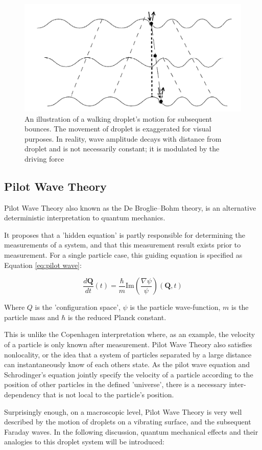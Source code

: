 \begin{figure}[htbp]
\includegraphics[width=12cm]{theory/walkingDroplet}
\centering
\caption{ An illustration of a walking droplet's motion for subsequent bounces. The movement of droplet is exaggerated for visual purposes. In reality, wave amplitude decays with distance from droplet and is not necessarily constant; it is modulated by the driving force }
\centering
\label{walker}

\end{figure}

\subsection{Pilot Wave Theory}
Pilot Wave Theory also known as the De Broglie–Bohm theory, is an alternative deterministic interpretation to quantum mechanics. 

It proposes that a 'hidden equation' is partly responsible for determining the measurements of a system, and that this measurement result exists prior to measurement. For a single particle case, this guiding equation is specified as Equation \ref{eq:pilot wave}: 

\begin{equation} \label{eq:pilot wave}
\frac{d\mathbf{Q}}{dt}(t) = \frac{\hbar}{m} \mathrm{Im}\left(\frac{\nabla \psi}{\psi}\right)(\mathbf{Q}, t)
\end{equation}


Where $Q$ is the 'configuration space', $\psi$ is the particle wave-function, $m$ is the particle mass and $\hbar$ is the reduced Planck constant. 

This is unlike the Copenhagen interpretation where, as an example, the velocity of a particle is only known after measurement. Pilot Wave Theory also satisfies nonlocality, or the idea that a system of particles separated by a large distance can instantaneously know of each others state. As the pilot wave equation and Schrodinger's equation jointly specify the velocity of a particle according to the position of other particles in the defined 'universe', there is a necessary inter-dependency that is not local to the particle's position. 

Surprisingly enough, on a macroscopic level, Pilot Wave Theory is very well described by the motion of droplets on a vibrating surface, and the subsequent Faraday waves. In the following discussion, quantum mechanical effects and their analogies to this droplet system will be introduced: